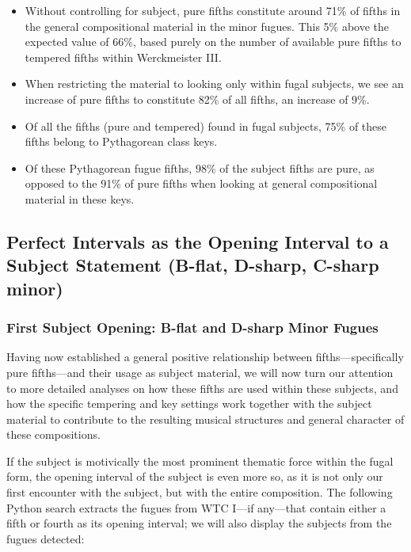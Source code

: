 \begin{itemize}
\tightlist
\item
  Without controlling for subject, pure fifths constitute around 71\% of
  fifths in the general compositional material in the minor fugues. This
  5\% above the expected value of 66\%, based purely on the number of
  available pure fifths to tempered fifths within Werckmeister III.
\item
  When restricting the material to looking only within fugal subjects,
  we see an increase of pure fifths to constitute 82\% of all fifths, an
  increase of 9\%.
\item
  Of all the fifths (pure and tempered) found in fugal subjects, 75\% of
  these fifths belong to Pythagorean class keys.
\item
  Of these Pythagorean fugue fifths, 98\% of the subject fifths are
  pure, as opposed to the 91\% of pure fifths when looking at general
  compositional material in these keys.
\end{itemize}

    \subsection{Perfect Intervals as the Opening Interval to a Subject
Statement (B-flat, D-sharp, C-sharp
minor)}\label{perfect-intervals-as-the-opening-interval-to-a-subject-statement-b-flat-d-sharp-c-sharp-minor}

\subsubsection{First Subject Opening: B-flat and D-sharp Minor
Fugues}\label{first-subject-opening-b-flat-and-d-sharp-minor-fugues}

Having now established a general positive relationship between
fifths---specifically pure fifths---and their usage as subject
material, we will now turn our attention to more detailed analyses on
how these fifths are used within these subjects, and how the specific
tempering and key settings work together with the subject material to
contribute to the resulting musical structures and general character of
these compositions.

If the subject is motivically the most prominent thematic force within
the fugal form, the opening interval of the subject is even more so, as
it is not only our first encounter with the subject, but with the entire
composition. The following Python search extracts the fugues from WTC
I---if any---that contain either a fifth or fourth as its
opening interval; we will also display the subjects from the fugues
detected:

